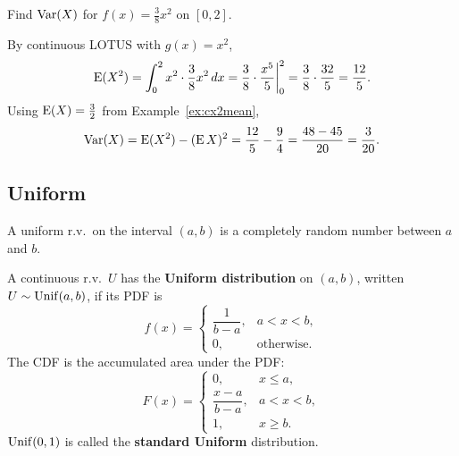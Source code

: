 \begin{example}
Find $\operatorname{Var}(X)$ for $f(x) = \tfrac{3}{8}x^{2}$ on $[0, 2]$.
\end{example}

\medskip

\begin{solution}
By continuous LOTUS with $g(x) = x^{2}$,
\medskip
\[
\operatorname{E}(X^{2}) = \int_{0}^{2} x^{2} \cdot \frac{3}{8}x^{2}\,dx = \frac{3}{8} \cdot \frac{x^{5}}{5}\bigg|_{0}^{2} = \frac{3}{8} \cdot \frac{32}{5} = \frac{12}{5}.
\]
\medskip
Using $\operatorname{E}(X) = \tfrac{3}{2}$ from Example~\ref{ex:cx2mean},
\medskip
\[
\operatorname{Var}(X) = \operatorname{E}(X^{2}) - (\operatorname{E} X)^{2} = \frac{12}{5} - \frac{9}{4} = \frac{48 - 45}{20} = \frac{3}{20}.
\]
\end{solution}

\medskip

\subsection{Uniform}

A uniform r.v.\ on the interval $(a, b)$ is a completely random number between $a$ and $b$.

\begin{definition}\label{def:unif}
  A continuous r.v.\ $U$ has the \textbf{Uniform distribution} on $(a, b)$, written $U \sim \operatorname{Unif}(a, b)$, if its PDF is
  \[
    f(x) =
    \begin{cases}
      \dfrac{1}{b - a}, & a < x < b, \\[0.6em]
      0,                & \text{otherwise}.
    \end{cases}
  \]
  The CDF is the accumulated area under the PDF:
  \[
    F(x) =
    \begin{cases}
      0,                  & x \le a,     \\[0.2em]
      \dfrac{x - a}{b - a}, & a < x < b, \\[0.6em]
      1,                  & x \ge b.
    \end{cases}
  \]
  $\operatorname{Unif}(0, 1)$ is called the \textbf{standard Uniform} distribution.
\end{definition}

